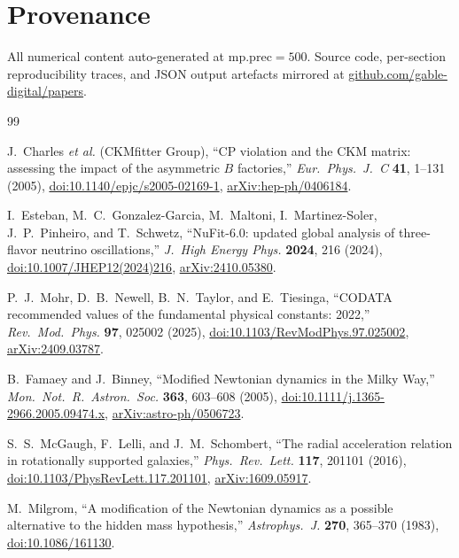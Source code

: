 \documentclass[reprint,amsmath,amssymb,aps,prd,longbibliography,floatfix]{revtex4-2}
\begin{document}
\section{Provenance}

All numerical content auto-generated at $\mathrm{mp.prec}=500$.
Source code, per-section reproducibility traces, and JSON output
artefacts mirrored at
\href{https://github.com/gable-digital/papers}{github.com/gable-digital/papers}.

\begin{thebibliography}{99}

J.~Charles \emph{et al.} (CKMfitter Group),
``CP violation and the CKM matrix: assessing the impact of the asymmetric
$B$ factories,''
\emph{Eur.~Phys.~J.~C} \textbf{41}, 1--131 (2005),
\href{https://doi.org/10.1140/epjc/s2005-02169-1}{doi:10.1140/epjc/s2005-02169-1},
\href{https://arxiv.org/abs/hep-ph/0406184}{arXiv:hep-ph/0406184}.

I.~Esteban, M.~C.~Gonzalez-Garcia, M.~Maltoni, I.~Martinez-Soler,
J.~P.~Pinheiro, and T.~Schwetz,
``NuFit-6.0: updated global analysis of three-flavor neutrino oscillations,''
\emph{J.~High Energy Phys.} \textbf{2024}, 216 (2024),
\href{https://doi.org/10.1007/JHEP12(2024)216}{doi:10.1007/JHEP12(2024)216},
\href{https://arxiv.org/abs/2410.05380}{arXiv:2410.05380}.

P.~J.~Mohr, D.~B.~Newell, B.~N.~Taylor, and E.~Tiesinga,
``CODATA recommended values of the fundamental physical constants: 2022,''
\emph{Rev.~Mod.~Phys.} \textbf{97}, 025002 (2025),
\href{https://doi.org/10.1103/RevModPhys.97.025002}{doi:10.1103/RevModPhys.97.025002},
\href{https://arxiv.org/abs/2409.03787}{arXiv:2409.03787}.

B.~Famaey and J.~Binney,
``Modified Newtonian dynamics in the Milky Way,''
\emph{Mon.~Not.~R.~Astron.~Soc.} \textbf{363}, 603--608 (2005),
\href{https://doi.org/10.1111/j.1365-2966.2005.09474.x}{doi:10.1111/j.1365-2966.2005.09474.x},
\href{https://arxiv.org/abs/astro-ph/0506723}{arXiv:astro-ph/0506723}.

S.~S.~McGaugh, F.~Lelli, and J.~M.~Schombert,
``The radial acceleration relation in rotationally supported galaxies,''
\emph{Phys.~Rev.~Lett.} \textbf{117}, 201101 (2016),
\href{https://doi.org/10.1103/PhysRevLett.117.201101}{doi:10.1103/PhysRevLett.117.201101},
\href{https://arxiv.org/abs/1609.05917}{arXiv:1609.05917}.

M.~Milgrom,
``A modification of the Newtonian dynamics as a possible alternative to
the hidden mass hypothesis,''
\emph{Astrophys.~J.} \textbf{270}, 365--370 (1983),
\href{https://doi.org/10.1086/161130}{doi:10.1086/161130}.


\end{thebibliography}
\end{document}
